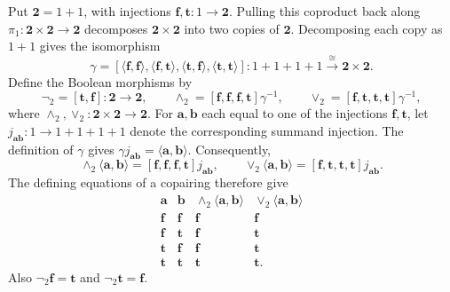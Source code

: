 \documentclass[11pt]{article}
\theoremstyle{definition}\newtheorem{definition}[theorem]{Definition}
\newcommand{\Two}{\mathbf 2}
\begin{document}
Put $\Two=1+1$, with injections
$\mathbf{f},\mathbf{t}:1\to\Two$. Pulling this coproduct back along
$\pi_1:\Two\times\Two\to\Two$ decomposes $\Two\times\Two$ into two copies of
$\Two$. Decomposing each copy as $1+1$ gives the isomorphism
\[
 \gamma=[\langle\mathbf{f},\mathbf{f}\rangle,
          \langle\mathbf{f},\mathbf{t}\rangle,
          \langle\mathbf{t},\mathbf{f}\rangle,
          \langle\mathbf{t},\mathbf{t}\rangle]:
          1+1+1+1\xrightarrow{\cong}\Two\times\Two.
\]
Define the Boolean morphisms by
\[
 \neg_2=[\mathbf{t},\mathbf{f}]:\Two\to\Two,\qquad
 \wedge_2=[\mathbf{f},\mathbf{f},\mathbf{f},\mathbf{t}]\gamma^{-1},
 \qquad
 \vee_2=[\mathbf{f},\mathbf{t},\mathbf{t},\mathbf{t}]\gamma^{-1},
\]
where $\wedge_2,\vee_2:\Two\times\Two\to\Two$.
For $\mathbf{a},\mathbf{b}$ each equal to one of the injections
$\mathbf{f},\mathbf{t}$, let $j_{\mathbf{a}\mathbf{b}}:1\to1+1+1+1$
denote the corresponding summand injection. The definition of $\gamma$ gives
$\gamma j_{\mathbf{a}\mathbf{b}}=\langle\mathbf{a},\mathbf{b}\rangle$.
Consequently,
\[
 \wedge_2\langle\mathbf{a},\mathbf{b}\rangle
 =[\mathbf{f},\mathbf{f},\mathbf{f},\mathbf{t}]
    j_{\mathbf{a}\mathbf{b}},\qquad
 \vee_2\langle\mathbf{a},\mathbf{b}\rangle
 =[\mathbf{f},\mathbf{t},\mathbf{t},\mathbf{t}]
    j_{\mathbf{a}\mathbf{b}}.
\]
The defining equations of a copairing therefore give
\[
\begin{array}{cc|cc}
 \mathbf{a}&\mathbf{b}&
 \wedge_2\langle\mathbf{a},\mathbf{b}\rangle&
 \vee_2\langle\mathbf{a},\mathbf{b}\rangle\\\hline
 \mathbf{f}&\mathbf{f}&\mathbf{f}&\mathbf{f}\\
 \mathbf{f}&\mathbf{t}&\mathbf{f}&\mathbf{t}\\
 \mathbf{t}&\mathbf{f}&\mathbf{f}&\mathbf{t}\\
 \mathbf{t}&\mathbf{t}&\mathbf{t}&\mathbf{t}.
\end{array}
\]
Also $\neg_2\mathbf{f}=\mathbf{t}$ and
$\neg_2\mathbf{t}=\mathbf{f}$.
\end{document}
